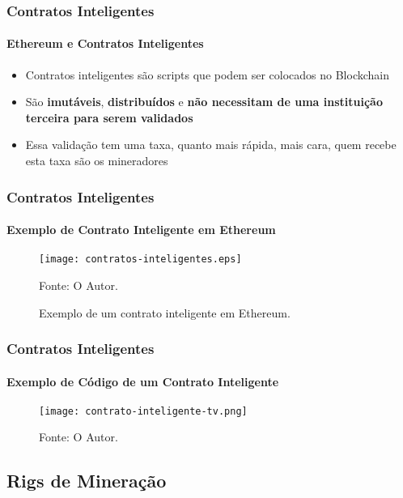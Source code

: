 \documentclass[aspectratio=43]{beamer}
\begin{document}
\begin{frame}
    \frametitle{Contratos Inteligentes}
    \framesubtitle{Ethereum e Contratos Inteligentes}
    
    \begin{itemize}
        \item Contratos inteligentes são scripts que podem ser
            colocados no Blockchain

        \item São \textbf{imutáveis}, \textbf{distribuídos} e
            \textbf{não necessitam de uma instituição terceira para
            serem validados}

        \item Essa validação tem uma taxa, quanto mais rápida, mais
            cara, quem recebe esta taxa são os mineradores
    
    \end{itemize}
\end{frame}

\begin{frame}
    \frametitle{Contratos Inteligentes}
    \framesubtitle{Exemplo de Contrato Inteligente em Ethereum}
\begin{figure}[H]
    \caption{\label{fig:contratos-inteligentes}Exemplo de um contrato
    inteligente em Ethereum.}
    \begin{center}
        \texttt{[image: contratos-inteligentes.eps]}
    \end{center}
    Fonte: O Autor.
\end{figure}

\end{frame}

\begin{frame}
    \frametitle{Contratos Inteligentes}
    \framesubtitle{Exemplo de Código de um Contrato Inteligente}
\begin{figure}[H]
    \begin{center}
        \texttt{[image: contrato-inteligente-tv.png]}
    \end{center}
    Fonte: O Autor.
\end{figure}

\end{frame}

\subsection{Rigs de Mineração}
\end{document}
